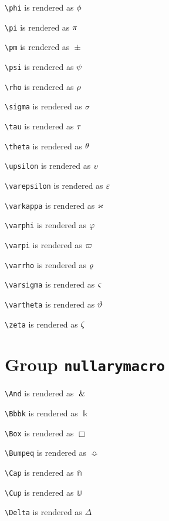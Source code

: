 \texttt{\textbackslash phi} is rendered as $\ce{\phi}$

\texttt{\textbackslash pi} is rendered as $\ce{\pi}$

\texttt{\textbackslash pm} is rendered as $\ce{\pm}$

\texttt{\textbackslash psi} is rendered as $\ce{\psi}$

\texttt{\textbackslash rho} is rendered as $\ce{\rho}$

\texttt{\textbackslash sigma} is rendered as $\ce{\sigma}$

\texttt{\textbackslash tau} is rendered as $\ce{\tau}$

\texttt{\textbackslash theta} is rendered as $\ce{\theta}$

\texttt{\textbackslash upsilon} is rendered as $\ce{\upsilon}$

\texttt{\textbackslash varepsilon} is rendered as $\ce{\varepsilon}$

\texttt{\textbackslash varkappa} is rendered as $\ce{\varkappa}$

\texttt{\textbackslash varphi} is rendered as $\ce{\varphi}$

\texttt{\textbackslash varpi} is rendered as $\ce{\varpi}$

\texttt{\textbackslash varrho} is rendered as $\ce{\varrho}$

\texttt{\textbackslash varsigma} is rendered as $\ce{\varsigma}$

\texttt{\textbackslash vartheta} is rendered as $\ce{\vartheta}$

\texttt{\textbackslash zeta} is rendered as $\ce{\zeta}$

\section{ Group \texttt{nullary\textunderscore macro}}

\texttt{\textbackslash And} is rendered as $\And$

\texttt{\textbackslash Bbbk} is rendered as $\Bbbk$

\texttt{\textbackslash Box} is rendered as $\Box$

\texttt{\textbackslash Bumpeq} is rendered as $\Bumpeq$

\texttt{\textbackslash Cap} is rendered as $\Cap$

\texttt{\textbackslash Cup} is rendered as $\Cup$

\texttt{\textbackslash Delta} is rendered as $\Delta$

